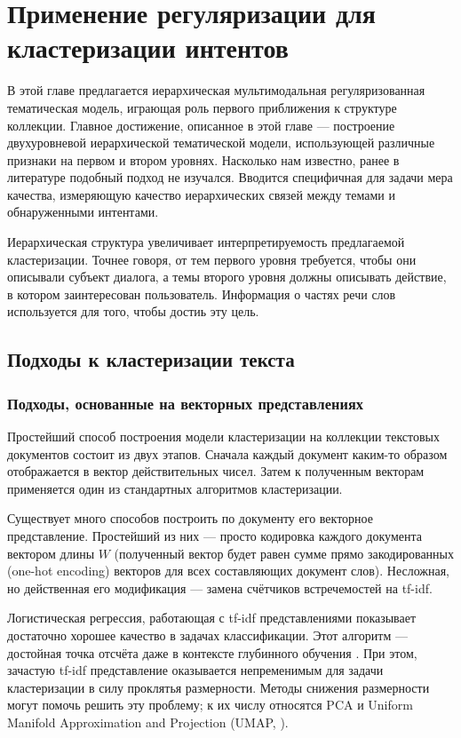 \chapter{Применение регуляризации для кластеризации интентов}



В этой главе предлагается иерархическая мультимодальная регуляризованная тематическая модель, играющая роль первого приближения к структуре коллекции. Главное достижение, описанное в этой главе --- построение двухуровневой иерархической тематической модели, использующей различные признаки на первом и втором уровнях. Насколько нам известно, ранее в литературе подобный подход не изучался.  Вводится специфичная для задачи мера качества, измеряющую качество иерархических связей между темами и обнаруженными интентами.

Иерархическая структура увеличивает интерпретируемость предлагаемой кластеризации. Точнее говоря, от тем первого уровня требуется, чтобы они описывали субъект диалога, а темы второго уровня должны описывать действие, в котором заинтересован пользователь. Информация о частях речи слов используется для того, чтобы достиь эту цель.


\section{Подходы к кластеризации текста}
\subsection{Подходы, основанные на векторных представлениях} \label{embeddings}

\par Простейший способ построения модели кластеризации на коллекции текстовых документов состоит из двух этапов. Сначала каждый документ каким-то образом отображается в вектор действительных чисел. Затем к полученным векторам применяется один из стандартных алгоритмов кластеризации.

\par Существует много способов построить по документу его векторное представление. Простейший из них --- просто кодировка каждого документа вектором длины $W$ (полученный вектор будет равен сумме прямо закодированных (one-hot encoding) векторов для всех составляющих документ слов). Несложная, но действенная его модификация --- замена счётчиков встречемостей на tf-idf.

Логистическая регрессия, работающая с tf-idf представлениями показывает достаточно хорошее качество в задачах классификации. Этот алгоритм --- достойная точка отсчёта даже в контексте глубинного обучения \cite{park2019adc}. При этом, зачастую tf-idf представление оказывается непременимым для задачи кластеризации в силу проклятья размерности. Методы снижения размерности могут помочь решить эту проблему; к их числу относятся PCA и Uniform Manifold Approximation and Projection (UMAP, \cite{mcinnes2018umap}).

